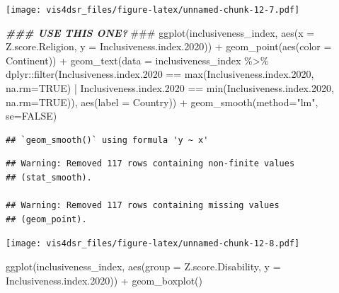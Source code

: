\documentclass[
]{krantz}
\makeatletter
\newenvironment{Shaded}{\begin{snugshade}}{\end{snugshade}}
\newcommand{\AlertTok}[1]{\textcolor[rgb]{0.33,0.33,0.33}{#1}}
\newcommand{\AttributeTok}[1]{\textcolor[rgb]{0.61,0.61,0.61}{#1}}
\newcommand{\ConstantTok}[1]{\textcolor[rgb]{0,0,0}{#1}}
\newcommand{\DocumentationTok}[1]{\textcolor[rgb]{0.37,0.37,0.37}{\textbf{\textit{#1}}}}
\newcommand{\FloatTok}[1]{\textcolor[rgb]{0.06,0.06,0.06}{#1}}
\newcommand{\FunctionTok}[1]{\textcolor[rgb]{0,0,0}{#1}}
\newcommand{\NormalTok}[1]{#1}
\newcommand{\SpecialCharTok}[1]{\textcolor[rgb]{0,0,0}{#1}}
\newcommand{\StringTok}[1]{\textcolor[rgb]{0.5,0.5,0.5}{#1}}
\newenvironment{kframe}{%
\medskip{}
\setlength{\fboxsep}{.8em}
 \def\at@end@of@kframe{}%
 \ifinner\ifhmode%
  \def\at@end@of@kframe{\end{minipage}}%
  \begin{minipage}{\columnwidth}%
 \fi\fi%
 \def\FrameCommand##1{\hskip\@totalleftmargin \hskip-\fboxsep
 \colorbox{shadecolor}{##1}\hskip-\fboxsep
     \hskip-\linewidth \hskip-\@totalleftmargin \hskip\columnwidth}%
 \MakeFramed {\advance\hsize-\width
   \@totalleftmargin\z@ \linewidth\hsize
   \@setminipage}}%
 {\par\unskip\endMakeFramed%
 \at@end@of@kframe}
\renewenvironment{Shaded}{\begin{kframe}}{\end{kframe}}
\makeatother
\begin{document}
\texttt{[image: vis4dsr\_files/figure-latex/unnamed-chunk-12-7.pdf]}

\begin{Shaded}
\begin{Highlighting}[]
\DocumentationTok{\#\#\# USE THIS ONE? }\AlertTok{\#\#\#}
\FunctionTok{ggplot}\NormalTok{(inclusiveness\_index, }
       \FunctionTok{aes}\NormalTok{(}\AttributeTok{x =}\NormalTok{ Z.score.Religion, }
           \AttributeTok{y =}\NormalTok{ Inclusiveness.index}\FloatTok{.2020}\NormalTok{)) }\SpecialCharTok{+}
  \FunctionTok{geom\_point}\NormalTok{(}\FunctionTok{aes}\NormalTok{(}\AttributeTok{color =}\NormalTok{ Continent)) }\SpecialCharTok{+}
  \FunctionTok{geom\_text}\NormalTok{(}\AttributeTok{data =}\NormalTok{ inclusiveness\_index }\SpecialCharTok{\%\textgreater{}\%} 
\NormalTok{              dplyr}\SpecialCharTok{::}\FunctionTok{filter}\NormalTok{(Inclusiveness.index}\FloatTok{.2020} \SpecialCharTok{==} \FunctionTok{max}\NormalTok{(Inclusiveness.index}\FloatTok{.2020}\NormalTok{, }\AttributeTok{na.rm=}\ConstantTok{TRUE}\NormalTok{) }\SpecialCharTok{|}\NormalTok{ Inclusiveness.index}\FloatTok{.2020} \SpecialCharTok{==} \FunctionTok{min}\NormalTok{(Inclusiveness.index}\FloatTok{.2020}\NormalTok{, }\AttributeTok{na.rm=}\ConstantTok{TRUE}\NormalTok{)), }\FunctionTok{aes}\NormalTok{(}\AttributeTok{label =}\NormalTok{ Country)) }\SpecialCharTok{+} 
  \FunctionTok{geom\_smooth}\NormalTok{(}\AttributeTok{method=}\StringTok{"lm"}\NormalTok{, }\AttributeTok{se=}\ConstantTok{FALSE}\NormalTok{)}
\end{Highlighting}
\end{Shaded}

\begin{verbatim}
## `geom_smooth()` using formula 'y ~ x'
\end{verbatim}

\begin{verbatim}
## Warning: Removed 117 rows containing non-finite values
## (stat_smooth).

## Warning: Removed 117 rows containing missing values
## (geom_point).
\end{verbatim}

\texttt{[image: vis4dsr\_files/figure-latex/unnamed-chunk-12-8.pdf]}

\begin{Shaded}
\begin{Highlighting}[]
\FunctionTok{ggplot}\NormalTok{(inclusiveness\_index, }
       \FunctionTok{aes}\NormalTok{(}\AttributeTok{group =}\NormalTok{ Z.score.Disability, }
           \AttributeTok{y =}\NormalTok{ Inclusiveness.index}\FloatTok{.2020}\NormalTok{)) }\SpecialCharTok{+}
  \FunctionTok{geom\_boxplot}\NormalTok{()}
\end{Highlighting}
\end{Shaded}
\end{document}
